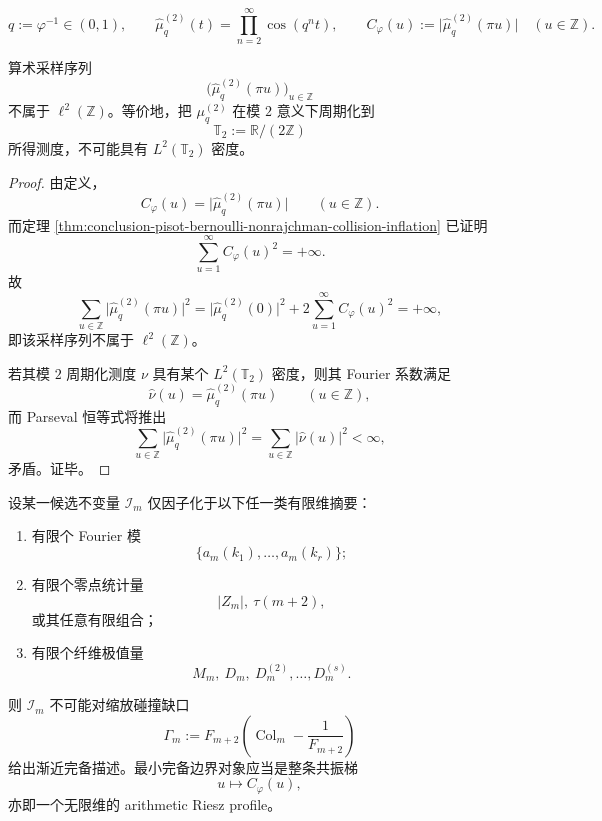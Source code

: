 \[
q:=\varphi^{-1}\in(0,1),
\qquad
\widehat\mu_q^{(2)}(t)=\prod_{n=2}^{\infty}\cos(q^n t),
\qquad
C_\varphi(u):=\bigl|\widehat\mu_q^{(2)}(\pi u)\bigr|
\quad (u\in\mathbb Z).
\]

\begin{theorem}\label{thm:conclusion-pisot-boundary-shadow-not-l2}
算术采样序列
\[
\bigl(\widehat\mu_q^{(2)}(\pi u)\bigr)_{u\in\mathbb Z}
\]
不属于 \(\ell^2(\mathbb Z)\)。等价地，把 \(\mu_q^{(2)}\) 在模 \(2\) 意义下周期化到
\[
\mathbb T_2:=\mathbb R/(2\mathbb Z)
\]
所得测度，不可能具有 \(L^2(\mathbb T_2)\) 密度。
\end{theorem}
\begin{proof}
由定义，
\[
C_\varphi(u)=\bigl|\widehat\mu_q^{(2)}(\pi u)\bigr|
\qquad (u\in\mathbb Z).
\]
而定理 \ref{thm:conclusion-pisot-bernoulli-nonrajchman-collision-inflation} 已证明
\[
\sum_{u=1}^{\infty}C_\varphi(u)^2=+\infty.
\]
故
\[
\sum_{u\in\mathbb Z}\bigl|\widehat\mu_q^{(2)}(\pi u)\bigr|^2
=
\bigl|\widehat\mu_q^{(2)}(0)\bigr|^2
+2\sum_{u=1}^{\infty}C_\varphi(u)^2
=+\infty,
\]
即该采样序列不属于 \(\ell^2(\mathbb Z)\)。

若其模 \(2\) 周期化测度 \(\nu\) 具有某个 \(L^2(\mathbb T_2)\) 密度，则其 Fourier 系数满足
\[
\widehat\nu(u)=\widehat\mu_q^{(2)}(\pi u)
\qquad (u\in\mathbb Z),
\]
而 Parseval 恒等式将推出
\[
\sum_{u\in\mathbb Z}\bigl|\widehat\mu_q^{(2)}(\pi u)\bigr|^2
=
\sum_{u\in\mathbb Z}|\widehat\nu(u)|^2
<\infty,
\]
矛盾。证毕。
\end{proof}

\begin{conjecture}[缩放碰撞缺口的最小完备边界对象]\label{conj:conclusion-resonance-ladder-minimal-complete-boundary-object}
设某一候选不变量 \(\mathcal I_m\) 仅因子化于以下任一类有限维摘要：
\begin{enumerate}
  \item 有限个 Fourier 模
  \[
  \{a_m(k_1),\dots,a_m(k_r)\};
  \]
  \item 有限个零点统计量
  \[
  |Z_m|,\ \tau(m+2),
  \]
  或其任意有限组合；
  \item 有限个纤维极值量
  \[
  M_m,\ D_m,\ D_m^{(2)},\dots,D_m^{(s)}.
  \]
\end{enumerate}
则 \(\mathcal I_m\) 不可能对缩放碰撞缺口
\[
\Gamma_m:=F_{m+2}\left(\operatorname{Col}_m-\frac1{F_{m+2}}\right)
\]
给出渐近完备描述。最小完备边界对象应当是整条共振梯
\[
u\longmapsto C_\varphi(u),
\]
亦即一个无限维的 arithmetic Riesz profile。
\end{conjecture}


